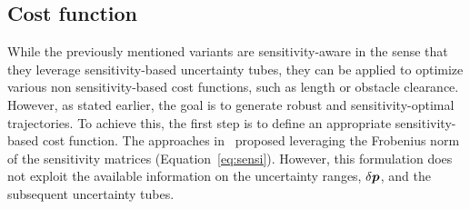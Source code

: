 
\subsection{Cost function}\label{sec:sensi_cost}

While the previously mentioned  variants are sensitivity-aware in the sense that they leverage sensitivity-based uncertainty tubes, they can be applied to optimize various non sensitivity-based cost functions, such as length or obstacle clearance.
However, as stated earlier, the goal is to generate robust and sensitivity-optimal trajectories.
To achieve this, the first step is to define an appropriate sensitivity-based cost function.
The approaches in~\cite{cPi, cTh} proposed leveraging the Frobenius norm of the sensitivity matrices (Equation~\ref{eq:sensi}).
However, this formulation does not exploit the available information on the uncertainty ranges, $\delta \boldsymbol{p}$, and the subsequent uncertainty tubes.

